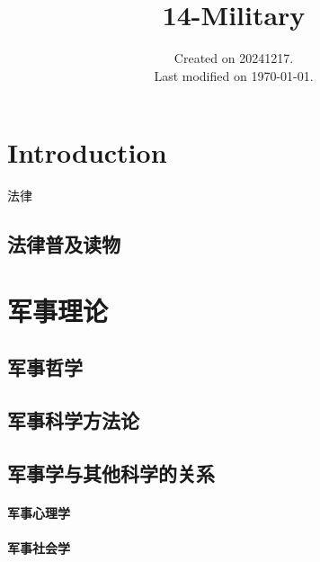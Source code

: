 \documentclass[UTF8]{../ApplicationUniverse}
\begin{document}
\title{14-Military}
\date{Created on 20241217.\\   Last modified on \today.}
\maketitle
\tableofcontents


\chapter{Introduction}
法律

\section{法律普及读物}







\chapter{军事理论}

\section{军事哲学}
\section{军事科学方法论}
\section{军事学与其他科学的关系}
    \subsubsection{军事心理学}
    \subsubsection{军事社会学}
\end{document}
